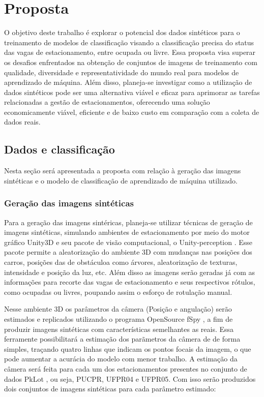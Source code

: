 \chapter{Proposta}


O objetivo deste trabalho é explorar o potencial dos dados sintéticos para o treinamento de modelos de classificação visando a classificação precisa do status das vagas de estacionamento, entre ocupada ou livre. Essa proposta visa superar os desafios enfrentados na obtenção de conjuntos de imagens de treinamento com qualidade, diversidade e representatividade do mundo real para modelos de aprendizado de máquina. Além disso, planeja-se investigar como a utilização de dados sintéticos pode ser uma alternativa viável e eficaz para aprimorar as tarefas relacionadas a gestão de estacionamentos, oferecendo uma solução economicamente viável, eficiente e de baixo custo em comparação com a coleta de dados reais.

\section{Dados e classificação}

Nesta seção será apresentada a proposta com relação à geração das imagens sintéticas e o modelo de classificação de aprendizado de máquina utilizado.

\subsection{Geração das imagens sintéticas}

Para a geração das imagens sintéricas, planeja-se utilizar técnicas de geração de imagens sintéticas, simulando ambientes de estacionamento por meio do motor gráfico Unity3D e seu pacote de visão computacional, o Unity-perception \cite{unity-perception}. Esse pacote permite a aleatorização do ambiente 3D com mudanças nas posições dos carros, posições das de obstáculoa como árvores, aleatorização de texturas, intensidade e posição da luz, etc. Além disso as imagens serão geradas já com as informações para recorte das vagas de estacionamento e seus respectivos rótulos, como ocupadas ou livres, poupando assim o esforço de rotulação manual.

Nesse ambiente 3D os parâmetros da câmera (Posição e angulação) serão estimados e replicados utilizando o programa OpenSource fSpy \cite{fSpy}, a fim de produzir imagens sintéticas com características semelhantes as reais. Essa ferramente possibilitará a estimação dos parãmetros da câmera de de forma simples, traçando quatro linhas que indicam os pontos focais da imagem, o que pode aumentar a acurácia do modelo com menor trabalho. A estimação da câmera será feita para cada um dos estacionamentos presentes no conjunto de dados PkLot \cite{pklot2}, ou seja, PUCPR, UFPR04 e UFPR05. Com isso serão produzidos dois conjuntos de imagens sintéticas para cada parâmetro estimado:

